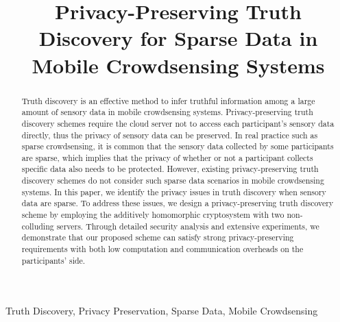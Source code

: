 \documentclass[conference]{IEEEtran}
\begin{document}
\title{Privacy-Preserving Truth Discovery for Sparse Data in Mobile Crowdsensing Systems\\
}

\author{
}
\maketitle

\begin{abstract}
Truth discovery is an effective method to infer truthful information among a large amount of sensory data in mobile crowdsensing systems.
Privacy-preserving truth discovery schemes require the cloud server not to access each participant's sensory data directly, thus the privacy of sensory data can be preserved.
In real practice such as sparse crowdsensing, it is common that the sensory data collected by some participants are sparse, which implies that the privacy of whether or not a participant collects specific data also needs to be protected.
However, existing privacy-preserving truth discovery schemes do not consider such sparse data scenarios in mobile crowdsensing systems.
In this paper, we identify the privacy issues in truth discovery when sensory data are sparse.
To address these issues, we design a privacy-preserving truth discovery scheme by employing the additively homomorphic cryptosystem with two non-colluding servers.
Through detailed security analysis and extensive experiments, we demonstrate that our proposed scheme can satisfy strong privacy-preserving requirements with both low computation and communication overheads on the participants' side.
\end{abstract}
\begin{IEEEkeywords}
Truth Discovery, Privacy Preservation, Sparse Data, Mobile Crowdsensing
\end{IEEEkeywords}
\end{document}
